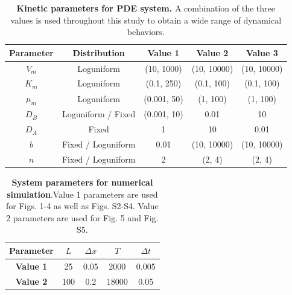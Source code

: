 \documentclass[10pt,letterpaper]{article}
\begin{document}
\begin{table}[H]
    \centering
    \renewcommand{\arraystretch}{1.3} %
    \begin{tabular}{|c|c|c|c|c|}
        \hline
        \textbf{Parameter} & \textbf{Distribution} & \textbf{Value 1} & \textbf{Value 2} & \textbf{Value 3} \\
        \hline
        $V_{m}$ & Loguniform & (10, 1000) & (10, 10000) & (10, 10000) \\
        \hline
        $K_{m}$ & Loguniform & (0.1, 250) & (0.1, 100) & (0.1, 100) \\
        \hline
        $\mu_{m}$ & Loguniform & (0.001, 50) & (1, 100)& (1, 100) \\
        \hline
        $D_{B}$ & Loguniform / Fixed & (0.001, 10) & 0.01 & 10 \\
        \hline
        $D_{A}$ & Fixed & 1 & 10 & 0.01 \\
        \hline
        $b$ & Fixed / Loguniform & 0.01 & (10, 10000) &  (10, 10000) \\
        \hline
        $n$ & Fixed / Loguniform & 2 & (2, 4) & (2, 4) \\
        \hline
    \end{tabular}
        \vspace{10pt}

    \caption{\textbf{Kinetic parameters for PDE system.} A combination of the three values is used throughout this study to obtain a wide range of dynamical behaviors.}
    \label{tab:sup_table1}
\end{table}




\begin{table}[H]
    \centering
    \renewcommand{\arraystretch}{1.3} %
    \begin{tabular}{|c|c|c|c|c|}
        \hline
        \textbf{Parameter} & $L$ & $\Delta x$ & $T$ & $\Delta t$ \\
        \hline
        \textbf{Value 1} & 25 & 0.05 & 2000 & 0.005 \\
        \hline
        \textbf{Value 2} & 100 & 0.2 & 18000 & 0.05 \\
        
        \hline
    \end{tabular}
    \vspace{10pt}
    \caption{\textbf{System parameters for numerical simulation}.Value 1 parameters are used for Figs. 1-4 as well as Figs. S2-S4. Value 2 parameters are used for Fig. 5 and Fig. S5.}
    \label{tab:sup_table2}
\end{table}
\end{document}
